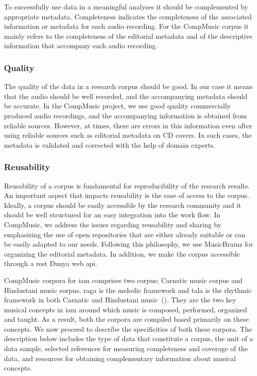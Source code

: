 To successfully use data in a meaningful analyses it should be complemented by appropriate metadata. Completeness indicates the completeness of the associated information or metadata for each audio recording. For the CompMusic corpus it mainly refers to the completeness of the editorial metadata and of the descriptive information that accompany each audio recording. 

\subsubsection{Quality}

The quality of the data in a research corpus should be good. In our case it means that the audio should be well recorded, and the accompanying metadata should be accurate. In the CompMusic project, we use good quality commercially produced audio recordings, and the accompanying information is obtained from reliable sources. However, at times, there are errors in this information even after using reliable sources such as editorial metadata on CD covers. In such cases, the metadata is validated and corrected with the help of domain experts. 

\subsubsection{Reusability}

Reusability of a corpus is fundamental for reproducibility of the research results. An important aspect that impacts reusability is the ease of access to the corpus. Ideally, a corpus should be easily accessible by the research community and it should be well structured for an easy integration into the work flow. In CompMusic, we address the issues regarding reusability and sharing by emphasizing the use of open repositories that are either already suitable or can be easily adapted to our needs. Following this philosophy, we use MusicBrainz for organizing the editorial metadata. In addition, we make the corpus accessible through a \acrshort{rest} Dunya web \gls{api}.

CompMusic corpora for \gls{iam} comprises two corpus; Carnatic music corpus and Hindustani music corpus. \Gls{raga} is the melodic framework and \gls{tala} is the rhythmic framework in both Carnatic and Hindustani music~(). They are the two key musical concepts in \gls{iam} around which music is composed, performed, organized and taught. As a result, both the corpora are compiled based primarily on these concepts. We now proceed to describe the specificities of both these corpora. The description below includes the type of data that constitute a corpus, the unit of a data sample, selected references for measuring completeness and coverage of the data, and resources for obtaining complementary information about musical concepts. 


